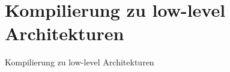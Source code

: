 \section{Kompilierung zu low-level Architekturen}
\begin{frame}{Kompilierung zu low-level Architekturen}
\end{frame}
